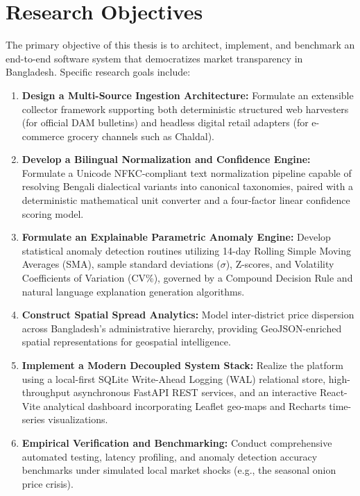 \section{Research Objectives}
The primary objective of this thesis is to architect, implement, and benchmark an end-to-end software system that democratizes market transparency in Bangladesh. Specific research goals include:
\begin{enumerate}
    \item \textbf{Design a Multi-Source Ingestion Architecture:} Formulate an extensible collector framework supporting both deterministic structured web harvesters (for official DAM bulletins) and headless digital retail adapters (for e-commerce grocery channels such as Chaldal).
    \item \textbf{Develop a Bilingual Normalization and Confidence Engine:} Formulate a Unicode NFKC-compliant text normalization pipeline capable of resolving Bengali dialectical variants into canonical taxonomies, paired with a deterministic mathematical unit converter and a four-factor linear confidence scoring model.
    \item \textbf{Formulate an Explainable Parametric Anomaly Engine:} Develop statistical anomaly detection routines utilizing 14-day Rolling Simple Moving Averages (SMA), sample standard deviations ($\sigma$), Z-scores, and Volatility Coefficients of Variation (CV\%), governed by a Compound Decision Rule and natural language explanation generation algorithms.
    \item \textbf{Construct Spatial Spread Analytics:} Model inter-district price dispersion across Bangladesh's administrative hierarchy, providing GeoJSON-enriched spatial representations for geospatial intelligence.
    \item \textbf{Implement a Modern Decoupled System Stack:} Realize the platform using a local-first SQLite Write-Ahead Logging (WAL) relational store, high-throughput asynchronous FastAPI REST services, and an interactive React-Vite analytical dashboard incorporating Leaflet geo-maps and Recharts time-series visualizations.
    \item \textbf{Empirical Verification and Benchmarking:} Conduct comprehensive automated testing, latency profiling, and anomaly detection accuracy benchmarks under simulated local market shocks (e.g., the seasonal onion price crisis).
\end{enumerate}

